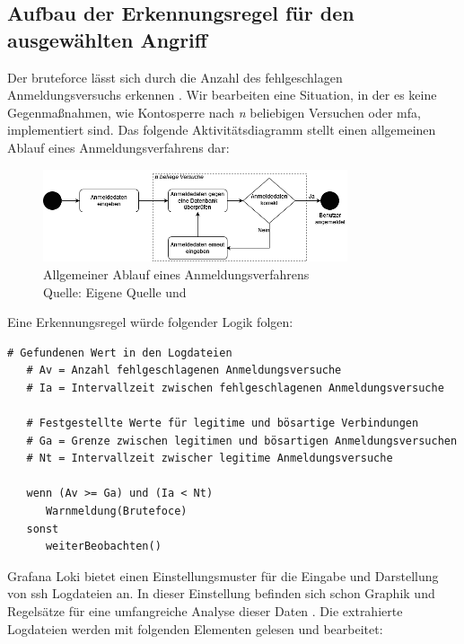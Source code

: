 \subsection{Aufbau der Erkennungsregel für den ausgewählten Angriff}
Der \gls{bruteforce} lässt sich durch die Anzahl des fehlgeschlagen Anmeldungsversuchs erkennen \citep{Selvaganesh_SplunkBruteForce}. Wir bearbeiten eine Situation, in der es keine Gegenmaßnahmen, wie Kontosperre nach \textit{n} beliebigen Versuchen oder \gls{mfa}, implementiert sind. Das folgende Aktivitätsdiagramm stellt einen allgemeinen Ablauf eines Anmeldungsverfahrens dar:

\begin{figure}[H]
   \centering
   \includegraphics[width=0.8\textwidth]{assets/Anmeldeverfahren.drawio.png}
   \caption{Allgemeiner Ablauf eines Anmeldungsverfahrens \\Quelle: Eigene Quelle und \citep{Selvaganesh_SplunkBruteForce}}
   \centering
\end{figure}

Eine Erkennungsregel würde folgender Logik folgen:
{
\begin{Verbatim}[frame=single]
   # Gefundenen Wert in den Logdateien
   # Av = Anzahl fehlgeschlagenen Anmeldungsversuche
   # Ia = Intervallzeit zwischen fehlgeschlagenen Anmeldungsversuche

   # Festgestellte Werte für legitime und bösartige Verbindungen
   # Ga = Grenze zwischen legitimen und bösartigen Anmeldungsversuchen
   # Nt = Intervallzeit zwischer legitime Anmeldungsversuche

   wenn (Av >= Ga) und (Ia < Nt)
      Warnmeldung(Brutefoce)
   sonst
      weiterBeobachten()
\end{Verbatim}
}

\newpage
Grafana Loki bietet einen Einstellungsmuster für die Eingabe und Darstellung von \gls{ssh} Logdateien an. In dieser Einstellung befinden sich schon Graphik und Regelsätze für eine umfangreiche Analyse dieser Daten \citep{VoidQuark_sshlogs}. Die extrahierte Logdateien werden mit folgenden Elementen gelesen und bearbeitet:

